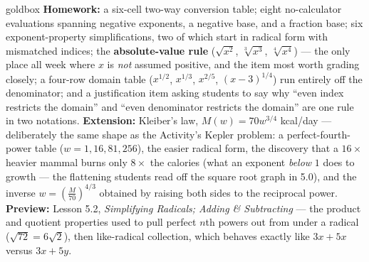 \documentclass[10pt]{article}
\begin{document}
\begin{skillbox}{goldbox}
\textbf{Homework:} a six-cell two-way conversion table; eight no-calculator evaluations spanning
negative exponents, a negative base, and a fraction base; six exponent-property simplifications,
two of which start in radical form with mismatched indices; the \textbf{absolute-value rule}
($\sqrt{x^{2}}$, $\sqrt[3]{x^{3}}$, $\sqrt[4]{x^{4}}$) --- the only place all week where $x$ is
\emph{not} assumed positive, and the item most worth grading closely; a four-row domain table
($x^{1/2}$, $x^{1/3}$, $x^{2/5}$, $(x-3)^{1/4}$) run entirely off the denominator; and a
justification item asking students to say why ``even index restricts the domain'' and ``even
denominator restricts the domain'' are one rule in two notations. \textbf{Extension:} Kleiber's law,
$M(w)=70w^{3/4}$ kcal/day --- deliberately the same shape as the Activity's Kepler problem: a
perfect-fourth-power table ($w=1,16,81,256$), the easier radical form, the discovery that a
$16\times$ heavier mammal burns only $8\times$ the calories (what an exponent \emph{below} $1$ does
to growth --- the flattening students read off the square root graph in 5.0), and the inverse
$w=\left(\frac{M}{70}\right)^{4/3}$ obtained by raising both sides to the reciprocal power.
\textbf{Preview:} Lesson 5.2, \emph{Simplifying Radicals; Adding \& Subtracting} --- the product and
quotient properties used to pull perfect $n$th powers out from under a radical ($\sqrt{72}=6\sqrt2$),
then like-radical collection, which behaves exactly like $3x+5x$ versus $3x+5y$.
\end{skillbox}
\end{document}
